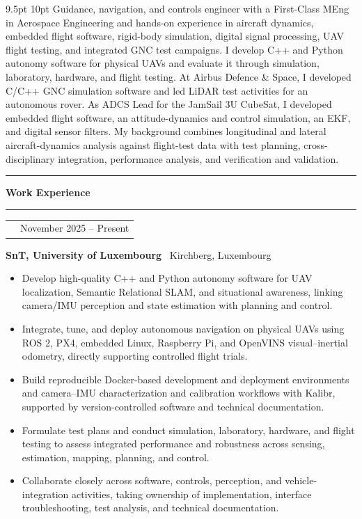 \documentclass[10pt,a4paper]{article}
\makeatletter
\newcommand{\StatementSize}{9.5pt}
\newcommand{\SectionSize}{11.5pt}
\newcommand{\RoleSize}{10.3pt}
\newcommand{\CompanySize}{9.6pt}
\newcommand{\DurationSize}{9pt}
\newcommand{\BodySize}{9.2pt}
\newcommand{\StatementLineSize}{10pt}
\newcommand{\SectionLineSize}{12pt}
\newcommand{\RoleLineSize}{11.5pt}
\newcommand{\CompanyLineSize}{10.8pt}
\newcommand{\DurationLineSize}{9pt}
\newcommand{\BodyLineSize}{11pt}
\newcommand{\HeaderAfter}{-5pt}
\newcommand{\StatementAfter}{4pt}
\newcommand{\SectionBefore}{4pt}
\newcommand{\SectionTitleToLine}{2pt}
\newcommand{\SectionLineToEntry}{0pt}
\newcommand{\EntryBefore}{0pt}
\newcommand{\RoleToCompany}{-5pt}
\newcommand{\CompanyToBullets}{3pt}
\newcommand{\EntryAfter}{6pt}
\newcommand{\BulletSpacing}{2pt}
\newcommand{\BulletBefore}{0pt}
\newcommand{\BulletIndent}{1.25em}
\newcommand{\SubsectionLineThickness}{0.4pt}
\newcommand{\CVLineThickness}{0.5pt}
\newcommand{\DurationWidth}{4.5cm}
\newcommand{\CVLine}{
    \vspace{\HeaderAfter}
    \noindent
    \textcolor{CVBlack}{
        \rule{\textwidth}{\CVLineThickness}
    }
    \vspace{\HeaderAfter}
}
\newcommand{\CVFirstSection}[1]{

    \vspace{\SectionBefore}


    {\fontsize{\SectionSize}{\SectionLineSize}
    \selectfont
    \textbf{\textcolor{CVBlack}{#1}}}

    \vspace{\SectionTitleToLine}


    \noindent
    \textcolor{CVLightGray}{
        \rule{\textwidth}{\SubsectionLineThickness}
    }

    \vspace{\SectionLineToEntry}
}
\newcommand{\CVEntry}[5]{

    \vspace{\EntryBefore}


    \noindent
    \begin{tabularx}{\textwidth}{
        @{}
        >{\raggedright\arraybackslash}X
        >{\raggedleft\arraybackslash}p{\DurationWidth}
        @{}
    }

        {\fontsize{\RoleSize}{\RoleLineSize}
        \selectfont
        \textbf{\textcolor{CVBlack}{#1}}}
        &
        {\fontsize{\DurationSize}{\DurationLineSize}
        \selectfont
        \textcolor{CVGray}{#4}}

    \end{tabularx}

    \vspace{\RoleToCompany}


    \noindent
    {\fontsize{\CompanySize}{\CompanyLineSize}
    \selectfont
    \textbf{\textcolor{CVDarkGray}{#2}}
    \textcolor{CVGray}{\textbar\ #3}}

    \vspace{\CompanyToBullets}


    \begin{itemize}[
        leftmargin=\BulletIndent,
        itemsep=\BulletSpacing,
        topsep=\BulletBefore,
        parsep=0pt,
        partopsep=0pt
    ]
        #5
    \end{itemize}

    \vspace{\EntryAfter}
}
\newcommand{\CVBullet}[1]{
    \item
    {\fontsize{\BodySize}{\BodyLineSize}
    \selectfont
    \textcolor{CVDarkGray}{#1}}
}
\makeatother
\begin{document}
{
    \fontsize
    {\StatementSize}
    {\StatementLineSize}
    \selectfont
    \textcolor{CVDarkGray}
    {
        Guidance, navigation, and controls engineer with a First-Class MEng in
        Aerospace Engineering and hands-on experience in aircraft dynamics, embedded
        flight software, rigid-body simulation, digital signal processing, UAV flight
        testing, and integrated GNC test campaigns. I develop C++ and Python autonomy
        software for physical UAVs and evaluate it through simulation, laboratory,
        hardware, and flight testing. At Airbus Defence \& Space, I developed C/C++ GNC
        simulation software and led LiDAR test activities for an autonomous rover. As
        ADCS Lead for the JamSail 3U CubeSat, I developed embedded flight software, an
        attitude-dynamics and control simulation, an EKF, and digital sensor filters.
        My background combines longitudinal and lateral aircraft-dynamics analysis
        against flight-test data with test planning, cross-disciplinary integration,
        performance analysis, and verification and validation.
    }
}

\vspace{\StatementAfter}

\CVLine


\CVFirstSection{Work Experience}

\CVEntry
{Doctoral Researcher -- Autonomous UAV Systems}
{SnT, University of Luxembourg}
{Kirchberg, Luxembourg}
{November 2025 -- Present}
{
    \CVBullet{Develop high-quality C++ and Python autonomy software for UAV localization, Semantic Relational SLAM, and situational awareness, linking camera/IMU perception and state estimation with planning and control.}

    \CVBullet{Integrate, tune, and deploy autonomous navigation on physical UAVs using ROS 2, PX4, embedded Linux, Raspberry Pi, and OpenVINS visual--inertial odometry, directly supporting controlled flight trials.}

    \CVBullet{Build reproducible Docker-based development and deployment environments and camera--IMU characterization and calibration workflows with Kalibr, supported by version-controlled software and technical documentation.}

    \CVBullet{Formulate test plans and conduct simulation, laboratory, hardware, and flight testing to assess integrated performance and robustness across sensing, estimation, mapping, planning, and control.}

    \CVBullet{Collaborate closely across software, controls, perception, and vehicle-integration activities, taking ownership of implementation, interface troubleshooting, test analysis, and technical documentation.}
}
\end{document}
